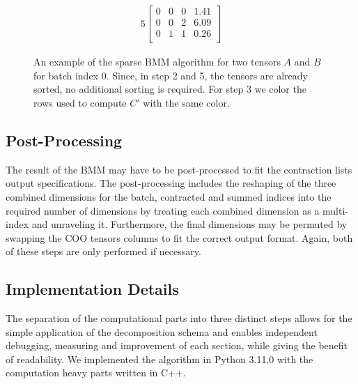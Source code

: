 \begin{figure}[H]
\begin{alignat*}{5}
\begin{bmatrix}
                                                                                                                                                      0 & 0   & 0   & 1.41 \\
                                                                                                                                                      0 & 0   & 2   & 6.09 \\
                                                                                                                                                      0 & 1   & 1   & 0.26 \\
                                                                                                                                                  \end{bmatrix}
    \end{alignat*}
    \caption{An example of the sparse BMM algorithm for two tensors $A$ and $B$ for batch index $0$.
        Since, in step 2 and 5, the tensors are already sorted, no additional sorting is required. For step 3
        we color the rows used to compute $C'$ with the same color.}
    \label{fig:bmm:algorithm}
\end{figure}
%

\subsection{Post-Processing}
The result of the BMM may have to be post-processed to fit the contraction lists output
specifications. The post-processing includes the reshaping of the three combined dimensions for
the batch, contracted and summed indices into the required number of dimensions by treating
each combined dimension as a multi-index and unraveling it. Furthermore, the final dimensions
may be permuted by swapping the COO tensors columns to fit the correct output format. Again,
both of these steps are only performed if necessary.

\subsection{Implementation Details}
The separation of the computational parts into three distinct steps allows for the simple application
of the decomposition schema and enables independent debugging, measuring and improvement of each section,
while giving the benefit of readability. We implemented the algorithm in Python 3.11.0 with the computation
heavy parts written in C++.

